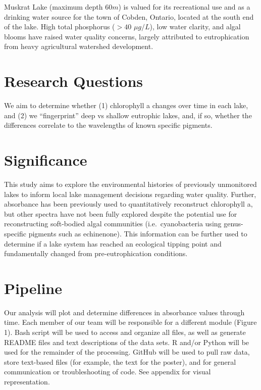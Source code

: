 \documentclass[]{article}
\begin{document}
Muskrat Lake (maximum depth \(60m\)) is valued for its recreational use
and as a drinking water source for the town of Cobden, Ontario, located
at the south end of the lake. High total phosphorus (\(>40\)
\(\mu g/L\)), low water clarity, and algal blooms have raised water
quality concerns, largely attributed to eutrophication from heavy
agricultural watershed development.

\section{Research Questions}\label{research-questions}

We aim to determine whether (1) chlorophyll a changes over time in each
lake, and (2) we ``fingerprint'' deep vs shallow eutrophic lakes, and,
if so, whether the differences correlate to the wavelengths of known
specific pigments.

\section{Significance}\label{significance}

This study aims to explore the environmental histories of previously
unmonitored lakes to inform local lake management decisions regarding
water quality. Further, absorbance has been previously used to
quantitatively reconstruct chlorophyll a, but other spectra have not
been fully explored despite the potential use for reconstructing
soft-bodied algal communities (i.e.~cyanobacteria using genus-specific
pigments such as echinenone). This information can be further used to
determine if a lake system has reached an ecological tipping point and
fundamentally changed from pre-eutrophication conditions.

\section{Pipeline}\label{pipeline}

Our analysis will plot and determine differences in absorbance values
through time. Each member of our team will be responsible for a
different module (Figure 1). Bash script will be used to access and
organize all files, as well as generate README files and text
descriptions of the data sets. R and/or Python will be used for the
remainder of the processing. GitHub will be used to pull raw data, store
text-based files (for example, the text for the poster), and for general
communication or troubleshooting of code. See appendix for visual
representation.
\end{document}
